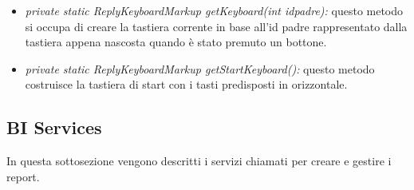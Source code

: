 \begin{itemize}
\item \textit{private static ReplyKeyboardMarkup getKeyboard(int idpadre):}
questo metodo si occupa di creare la tastiera corrente in base all’id padre rappresentato dalla tastiera appena nascosta quando è stato premuto un bottone. 

\item \textit{private static ReplyKeyboardMarkup getStartKeyboard():}
questo metodo costruisce la tastiera di start con i tasti predisposti in orizzontale.

\end{itemize}

\subsection{BI Services}

In questa sottosezione vengono descritti i servizi chiamati per creare e gestire i report. \\

